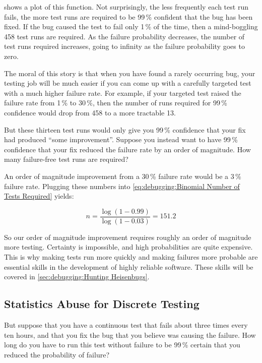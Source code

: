 shows a plot of this function.
Not surprisingly, the less frequently each test run fails, the more
test runs are required to be 99\,\% confident that the bug has been
fixed.
If the bug caused the test to fail only 1\,\% of the time, then a
mind-boggling 458 test runs are required.
As the failure probability decreases, the number of test runs required
increases, going to infinity as the failure probability goes to zero.

The moral of this story is that when you have found a rarely occurring
bug, your testing job will be much easier if you can come up with
a carefully targeted test with a much higher failure rate.
For example, if your targeted test raised the failure rate from 1\,\%
to 30\,\%, then the number of runs required for 99\,\% confidence
would drop from 458 to a more tractable 13.

But these thirteen test runs would only give you 99\,\% confidence that
your fix had produced ``some improvement''.
Suppose you instead want to have 99\,\% confidence that your fix reduced
the failure rate by an order of magnitude.
How many failure-free test runs are required?

An order of magnitude improvement from a 30\,\% failure rate would be
a 3\,\% failure rate.
Plugging these numbers into
\cref{eq:debugging:Binomial Number of Tests Required} yields:

\begin{equation}
	n = \frac{\log\left(1 - 0.99\right)}{\log\left(1 - 0.03\right)} = 151.2
\end{equation}

So our order of magnitude improvement requires roughly an order of
magnitude more testing.
Certainty is impossible, and high probabilities are quite expensive.
This is why making tests run more quickly and making failures more
probable are essential skills in the development of highly reliable
software.
These skills will be covered in
\cref{sec:debugging:Hunting Heisenbugs}.

\subsection{Statistics Abuse for Discrete Testing}
\label{sec:debugging:Statistics Abuse for Discrete Testing}

But suppose that you have a continuous test that fails about three
times every ten hours, and that you fix the bug that you believe was
causing the failure.
How long do you have to run this test without failure to be 99\,\% certain
that you reduced the probability of failure?

